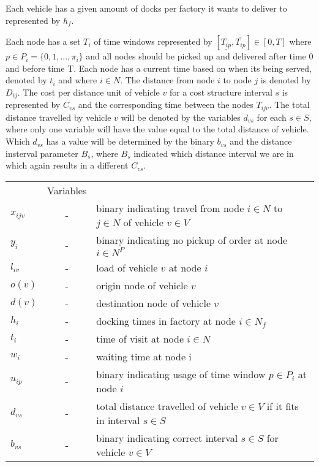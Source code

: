 \documentclass[a4paper,10pt]{article}
\begin{document}
Each vehicle has a given amount of docks per factory it wants to deliver to represented by $h_{f}$. \par 
Each node has a set $T_{i}$ of time windows represented by $[ \underline{T_{ip}},  \overline{T_{ip}} ] \in [0,T]$ where $p \in P_i=\{0,1,...,\pi_i\}$ and all nodes should be picked up and delivered after time 0 and before time T. 
Each node has a current time based on when its being served, denoted by $t_{i}$ and where $i \in N$. 
The distance from node $i$ to node $j$ is denoted by $D_{ij}$. 
The cost per distance unit of vehicle $v$ for a cost structure interval $s$ is represented by $C_{vs}$ and the corresponding time between the nodes $T_{ijv}$. 
The total distance travelled by vehicle $v$ will be denoted by the variables $d_{vs}$ for each $s\in S$, where only one variable will have the value equal to the total distance of vehicle. 
Which $d_{vs}$ has a value will be determined by the binary $b_{vs}$ and the distance insterval parameter $B_s$, where $B_s$ indicated which distance interval we are in which again results in a different $C_{vs}$. 
\linebreak

\begin{tabular} {l c l}
    			&Variables										\\
	$x_{ijv}$	&-& 	binary indicating travel from node $i\in N$ to $j\in N$ of vehicle $v\in V$	\\
    	$y_i    $ 	&-& 	binary indicating no pickup of order at node $i\in N^P$				\\
	$l_{iv}	$	&-&	load of vehicle $v$ at node $i$							\\ 
    	$o(v)   $ 	&-& 	origin node of vehicle $v$							\\
	$d(v)	$	&-&	destination node of vehicle $v$							\\
	$h_i	$	&-&	docking times in factory at node $i\in N_f$					\\
	$t_i 	$	&-&	time of visit at node $i\in N$							\\
    	$w_i	$ 	&-& 	waiting time at node i								\\ 
	$u_{ip}	$	&-&	binary indicating usage of time window $p\in P_i$ at node $i$			\\
    	$d_{vs} $	&-& 	total distance travelled of vehicle $v\in V$ if it fits in interval $s\in S$	\\
	$b_{vs} $	&-&	binary indicating correct interval $s\in S$ for vehicle $v\in V$		\\
\end{tabular}
\linebreak
\linebreak
\par
\end{document}
